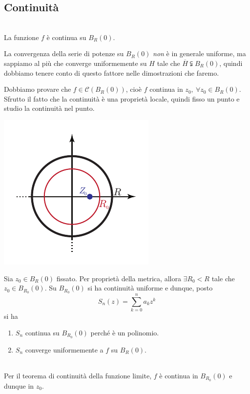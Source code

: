 \subsection{Continuità}
\begin{proposition}~{}\\
	La funzione $f$ è continua su $B_R\left(0\right)$.
\end{proposition}
\begin{attention}
	La convergenza della serie di potenze su $B_R\left(0\right)$ \textit{non} è in generale uniforme, ma sappiamo al più che converge uniformemente su $H$ tale che $\overline{H}\subsetneqq B_R\left(0\right)$, quindi dobbiamo tenere conto di questo fattore nelle dimostrazioni che faremo.
\end{attention}
\begin{demonstration}
	Dobbiamo provare che $f\in\mathcal{C}\left(B_R\left(0\right)\right)$, cioè $f$ continua in $z_0,\ \forall z_0\in B_R\left(0\right)$. Sfrutto il fatto che la continuità è una proprietà locale, quindi fisso un punto e studio la continuità nel punto.\\	\vspace{3mm}
	\begin{minipage}{0.44\textwidth}
		\includegraphics[trim=0cm 0cm 0cm 0cm, clip, scale=1.1]{images/discoconvergenzacontinuitaf.pdf}
	\end{minipage}\hspace{-9mm}
	\begin{minipage}{0.60\textwidth}
		Sia $z_0\in B_R\left(0\right)$ fissato. Per proprietà della metrica, allora $\exists R_0 < R$ tale che $z_0\in B_{R_0}\left(0\right)$. Su $B_{R_0}\left(0\right)$ si ha continuità uniforme e dunque, posto
		\begin{equation*}
			S_n\left(z\right)=\sum_{k=0}^{n}a_kz^k
		\end{equation*}
		si ha
		\begin{enumerate}
			\item $S_n$ continua su $B_{R_0}\left(0\right)$ perché è un polinomio.
			\item $S_n$ converge uniformemente a $f$ su $B_R\left(0\right)$.
		\end{enumerate}
	\end{minipage}\\
	Per il teorema di continuità della funzione limite, $f$ è continua in $B_{R_0}\left(0\right)$ e dunque in $z_0$. 
\end{demonstration}
